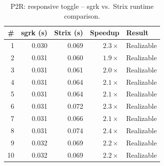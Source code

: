 \begin{table}[htbp]
\centering
\caption{P2R: responsive toggle -- sgrk vs.\ Strix runtime comparison.}
\label{tab:P2R_responsive_toggle}
\begin{tabular}{r r r r l}
\toprule
\# & sgrk (s) & Strix (s) & Speedup & Result \\
\midrule
1 & 0.030 & 0.069 & $2.3\times$ & Realizable \\
2 & 0.031 & 0.060 & $1.9\times$ & Realizable \\
3 & 0.031 & 0.061 & $2.0\times$ & Realizable \\
4 & 0.031 & 0.064 & $2.1\times$ & Realizable \\
5 & 0.031 & 0.064 & $2.1\times$ & Realizable \\
6 & 0.031 & 0.072 & $2.3\times$ & Realizable \\
7 & 0.031 & 0.066 & $2.1\times$ & Realizable \\
8 & 0.031 & 0.074 & $2.4\times$ & Realizable \\
9 & 0.032 & 0.069 & $2.2\times$ & Realizable \\
10 & 0.032 & 0.069 & $2.2\times$ & Realizable \\
\bottomrule
\end{tabular}
\end{table}
